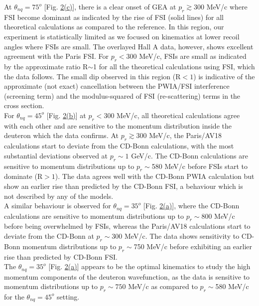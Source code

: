 \indent At $\theta_{nq}=75^{o}$ [Fig. \hyperref[fig:fig2]{2(c)}], there is a clear onset of GEA at $p_{r}\gtrsim300$ MeV/c where FSI become dominant as indicated by the rise of FSI (solid lines) for
all theoretical calculations as compared to the reference. In this region, our experiment is statistically limited as we focused on kinematics at lower recoil angles where FSIs are small. The overlayed
Hall A data, however, shows excellent agreement with the Paris FSI. For $p_{r}<300$ MeV/c, FSIs are small as indicated by the approximate ratio R$\sim$1 for all the theoretical calculations using FSI, which the
data follows. The small dip observed in this region (R$<1$) is indicative of the approximate (not exact) cancellation between the PWIA/FSI interference (screening term) and the modulus-squared of FSI (re-scattering) terms in
the cross section. \\
\indent For $\theta_{nq}=45^{o}$ [Fig. \hyperref[fig:fig2]{2(b)}] at $p_{r}<300$ MeV/c, all theoretical calculations agree with each other and are sensitive to the momentum distribution inside the deuteron which
the data confirms. At $p_{r}\gtrsim300$ MeV/c, the Paris/AV18 calculations start to deviate from the CD-Bonn calculations, with the most substantial deviations observed at $p_{r}\sim 1$ GeV/c.
The CD-Bonn calculations are sensitive to momentum distributions up to $p_{r}\sim$580 MeV/c before FSIs start to dominate (R$>1$).
The data agrees well with the CD-Bonn PWIA calculation but show an earlier rise than predicted by the CD-Bonn FSI, a behaviour which is not described by any of the models. \\
\indent A similar behaviour is observed for $\theta_{nq}=35^{o}$ [Fig. \hyperref[fig:fig2]{2(a)}], where the CD-Bonn calculations are sensitive to momentum distributions up to $p_{r}\sim800$ MeV/c before being
overwhelmed by FSIs, whereas the Paris/AV18 calculations start to deviate from the CD-Bonn at $p_{r}\sim300$ MeV/c. The data shows sensitivity to CD-Bonn momentum distributions up to $p_{r}\sim$750 MeV/c before
exhibiting an earlier rise than predicted by CD-Bonn FSI. \\ 
\indent The $\theta_{nq}=35^{o}$ [Fig. \hyperref[fig:fig2]{2(a)}] appears to be the optimal kinematics to study the high momentum components of the deuteron wavefunction, as the data is sensitive to momentum
distributions up to $p_{r}\sim750$ MeV/c as compared to $p_{r}\sim$580 MeV/c for the $\theta_{nq}=45^{o}$ setting. \\
